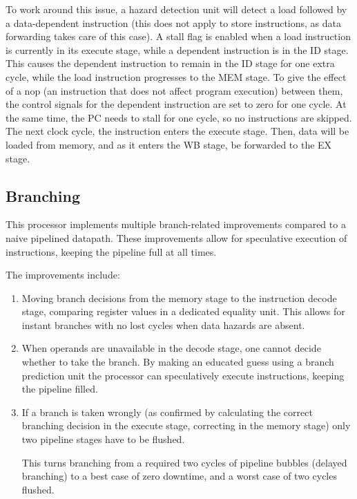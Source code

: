 To work around this issue, a hazard detection unit will detect a load followed by a data-dependent instruction (this does not apply to store instructions, as data forwarding takes care of this case).
A stall flag is enabled when a load instruction is currently in its execute stage, while a dependent instruction is in the ID stage.
This causes the dependent instruction to remain in the ID stage for one extra cycle, while the load instruction progresses to the MEM stage.
To give the effect of a nop (an instruction that does not affect program execution) between them, the control signals for the dependent instruction are set to zero for one cycle.
At the same time, the PC needs to stall for one cycle, so no instructions are skipped.
The next clock cycle, the instruction enters the execute stage.
Then, data will be loaded from memory, and as it enters the WB stage, be forwarded to the EX stage.

\subsection{Branching}

This processor implements multiple branch-related improvements compared to a naive pipelined datapath.
These improvements allow for speculative execution of instructions, keeping the pipeline full at all times.

The improvements include:
\begin{enumerate}
  \item
    Moving branch decisions from the memory stage to the instruction decode stage, comparing register values in a dedicated equality unit.
    This allows for instant branches with no lost cycles when data hazards are absent.
  \item
    When operands are unavailable in the decode stage, one cannot decide whether to take the branch.
    By making an educated guess using a branch prediction unit the processor can speculatively execute instructions, keeping the pipeline filled.
  \item
    If a branch is taken wrongly (as confirmed by calculating the correct branching decision in the execute stage, correcting in the memory stage) only two pipeline stages have to be flushed.

    This turns branching from a required two cycles of pipeline bubbles (delayed branching) to a best case of zero downtime, and a worst case of two cycles flushed.
\end{enumerate}

